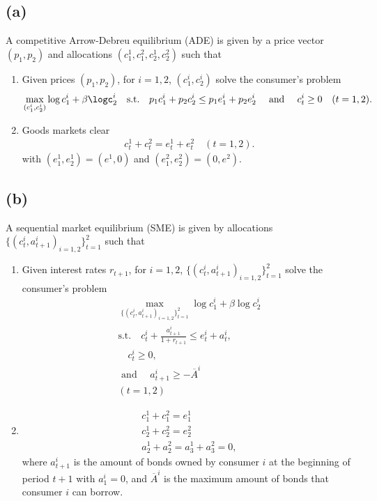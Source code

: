 \documentclass[a4paper]{article}
\begin{document}
\subsection*{(a)}
A competitive Arrow-Debreu equilibrium (ADE) is given by a price vector $(p_1, p_2)$ and allocations $(c_1^1, c_1^2, c_2^1, c_2^2)$ such that
\begin{enumerate}
    \item Given prices $(p_1, p_2)$, for $i = 1,2$, $(c_1^i, c_2^i)$ solve the consumer's problem
    \begin{gather*}
        \max_{(c_1^i, c_2^i)} \log c_1^i + \beta \logc_2^i \quad \text{s.t.} \quad p_1 c_1^i + p_2 c_2^i \leq p_1 e_1^i + p_2 e_2^i \quad \text{ and } \quad c_t^i \geq 0 \quad (t = 1,2).
    \end{gather*}
    \item Goods markets clear
    \begin{gather*}
        c_t^1 + c_t^2 = e_t^1 + e_t^2 \quad (t=1,2).
    \end{gather*}
    with $(e_1^1, e_2^1) = (e^1, 0)$ and $(e_1^2, e_2^2) = (0, e^2)$.
\end{enumerate}

\subsection*{(b)}

A sequential market equilibrium (SME) is given by allocations $\{(c_t^i, a_{t+1}^i)_{i=1,2}\}_{t=1}^2$ such that
\begin{enumerate}
    \item Given interest rates $r_{t+1}$, for $i = 1,2$, $\{(c_t^i, a_{t+1}^i)_{i=1,2}\}_{t=1}^2$ solve the consumer's problem
    \begin{gather*}
        \max_{\{(c_t^i, a_{t+1}^i)_{i=1,2}\}_{t=1}^2} \log c_1^i + \beta \log c_2^i \\
        \text{s.t.} \quad  c_t^i + \frac{a_{t+1}^i}{1 + r_{t+1}} \leq e_t^i + a_t^i, \\
         \quad c_t^i \geq 0 ,\\
         \text{ and } \quad a_{t+1}^i \geq -{\overline{A}}^i \\
         (t = 1,2)
    \end{gather*}
    \item 
    \begin{gather*}
        c_1^1 + c_1^2 = e_1^1\\
        c_2^1 + c_2^2 = e_2^2\\ 
        a_2^1 + a_2^2  = a_3^1 + a_3^2  = 0,
    \end{gather*}
    where $a_{t+1}^i$ is the amount of bonds owned by consumer $i$ at the beginning of period $t+1$ with $a_1^i = 0$, and $\overline{A}^i$ is the maximum amount of bonds that consumer $i$ can borrow.
\end{enumerate}
\end{document}
